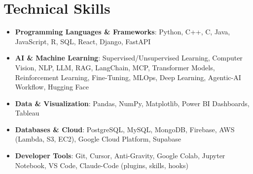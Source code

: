 \documentclass[letterpaper,11pt]{article}
\makeatletter
\newcommand{\resumeItem}[1]{\item\small{#1 \vspace{-4pt}}}
\newcommand{\resumeSubheading}[4]{
    \vspace{-2pt}\item
    \begin{tabular*}{1.0\textwidth}[t]{l@{\extracolsep{\fill}}r}
        \textbf{#1} & \textbf{\small #2} \\
        \textit{\small#3} & \textit{\small #4}
    \end{tabular*}\vspace{-7pt}
}
\newcommand{\resumeSubItem}[1]{\resumeItem{#1}\vspace{-4pt}}
\newcommand{\resumeSubHeadingListStart}{\begin{itemize}[leftmargin=0.0in, label={}]}
\newcommand{\resumeSubHeadingListEnd}{\end{itemize}}
\newcommand{\resumeItemListStart}{\begin{itemize}}
\newcommand{\resumeItemListEnd}{\end{itemize}\vspace{-7pt}}
\makeatother
\begin{document}




\vspace{-0.4cm}
\vspace{3pt}
\section{Technical Skills}
\resumeSubHeadingListStart
\resumeSubItem{\textbf{Programming Languages \& Frameworks}{: Python, C++, C, Java, JavaScript, R, SQL, React, Django, FastAPI}}
\vspace{4pt}
\resumeSubItem{\textbf{AI \& Machine Learning}{: Supervised/Unsupervised Learning, Computer Vision, NLP, LLM, RAG, LangChain, MCP, Transformer Models, Reinforcement Learning, Fine-Tuning, MLOps, Deep Learning, Agentic-AI Workflow, Hugging Face}}
\vspace{4pt}
\resumeSubItem{\textbf{Data \& Visualization}{: Pandas, NumPy, Matplotlib, Power BI Dashboards, Tableau}}
\vspace{4pt}
\resumeSubItem{\textbf{Databases \& Cloud}{: PostgreSQL, MySQL, MongoDB, Firebase, AWS (Lambda, S3, EC2), Google Cloud Platform, Supabase}}
\vspace{4pt}
\resumeSubItem{\textbf{Developer Tools}{: Git, Cursor, Anti-Gravity, Google Colab, Jupyter Notebook, VS Code, Claude-Code (plugins, skills, hooks)}}
\resumeSubHeadingListEnd
\end{document}
